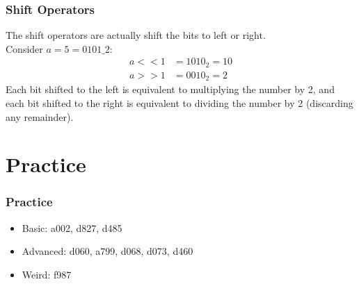 \documentclass[xcolor=dvipsnames]{beamer}
\begin{document}
    \begin{frame}
        \frametitle{Shift Operators}
        The shift operators are actually shift the bits to left or right.\\
        Consider $a=5=0101\_2$:
        \begin{align*}
            a << 1 &= 1010_2 = 10  \\
            a >> 1 &= 0010_2 = 2
        \end{align*}
        Each bit shifted to the left is equivalent to multiplying the number by 2, and each bit shifted to the right is equivalent to dividing the number by 2 (discarding any remainder).
    \end{frame}

    \section{Practice}
    \begin{frame}
        \frametitle{Practice}
        \begin{itemize}
            \item Basic: a002, d827, d485
            \item Advanced: d060, a799, d068, d073, d460
            \item Weird: f987
        \end{itemize}
    \end{frame}
\end{document}
